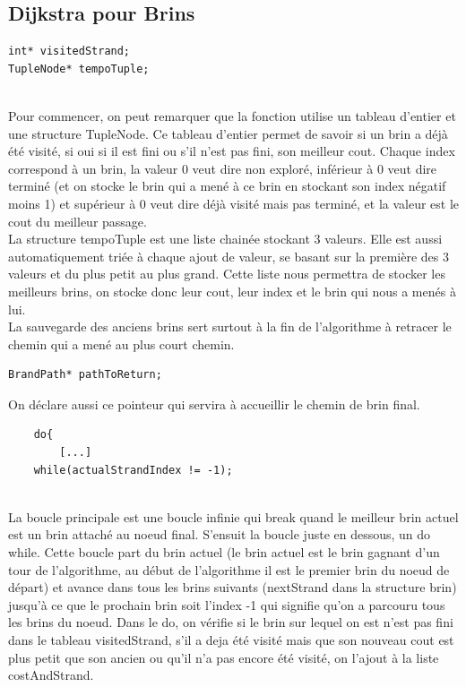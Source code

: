 \documentclass[11pt]{article}
\begin{document}
\subsection{Dijkstra pour Brins}
\begin{lstlisting}
int* visitedStrand;
TupleNode* tempoTuple;
\end{lstlisting}\\
Pour commencer, on peut remarquer que la fonction utilise un tableau d'entier et une structure TupleNode. Ce tableau d'entier permet de savoir si un brin a déjà été visité, si oui si il est fini ou s'il n'est pas fini, son meilleur cout. Chaque index correspond à un brin, la valeur 0 veut dire non exploré, inférieur à 0 veut dire terminé (et on stocke le brin qui a mené à ce brin en stockant son index négatif moins 1) et supérieur à 0 veut dire déjà visité mais pas terminé, et la valeur est le cout du meilleur passage.\\
La structure tempoTuple est une liste chainée stockant 3 valeurs. Elle est aussi automatiquement triée à chaque ajout de valeur, se basant sur la première des 3 valeurs et du plus petit au plus grand. Cette liste nous permettra de stocker les meilleurs brins, on stocke donc leur cout, leur index et le brin qui nous a menés à lui.\\
La sauvegarde des anciens brins sert surtout à la fin de l'algorithme à retracer le chemin qui a mené au plus court chemin.\\
\begin{lstlisting}
BrandPath* pathToReturn;
\end{lstlisting}
On déclare aussi ce pointeur qui servira à accueillir le chemin de brin final.\\
\begin{lstlisting}
    do{
        [...]
    while(actualStrandIndex != -1);
\end{lstlisting}\\
La boucle principale est une boucle infinie qui break quand le meilleur brin actuel est un brin attaché au noeud final. S'ensuit la boucle juste en dessous, un do while. Cette boucle part du brin actuel (le brin actuel est le brin gagnant d'un tour de l'algorithme, au début de l'algorithme il est le premier brin du noeud de départ) et avance dans tous les brins suivants (nextStrand dans la structure brin) jusqu'à ce que le prochain brin soit l'index -1 qui signifie qu'on a parcouru tous les brins du noeud.
Dans le do, on vérifie si le brin sur lequel on est n'est pas fini dans le tableau visitedStrand, s'il a deja été visité mais que son nouveau cout est plus petit que son ancien ou qu'il n'a pas encore été visité, on l'ajout à la liste costAndStrand.\\
\end{document}
